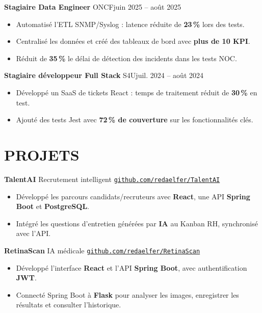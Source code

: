 \documentclass[11pt,a4paper]{article}
\newcommand{\entry}[2]{\noindent #1\hfill #2\par}
\newcommand{\jobgap}{\vspace{5pt}}
\begin{document}
\jobgap
\entry{\textbf{Stagiaire Data Engineer} \textbar{} ONCF}{juin 2025 -- août 2025}
\begin{itemize}
  \item Automatisé l'ETL SNMP/Syslog : latence réduite de \textbf{23\,\%} lors des tests.
  \item Centralisé les données et créé des tableaux de bord avec \textbf{plus de 10 KPI}.
  \item Réduit de \textbf{35\,\%} le délai de détection des incidents dans les tests NOC.
\end{itemize}

\jobgap
\entry{\textbf{Stagiaire développeur Full Stack} \textbar{} S4U}{juil. 2024 -- août 2024}
\begin{itemize}
  \item Développé un SaaS de tickets React : temps de traitement réduit de \textbf{30\,\%} en test.
  \item Ajouté des tests Jest avec \textbf{72\,\% de couverture} sur les fonctionnalités clés.
\end{itemize}

\section*{PROJETS}

\textbf{TalentAI} \textbar{} Recrutement intelligent \textbar{} \href{https://github.com/redaelfer/TalentAI}{\nolinkurl{github.com/redaelfer/TalentAI}}\par
\begin{itemize}
  \item Développé les parcours candidats/recruteurs avec \textbf{React}, une API \textbf{Spring Boot} et \textbf{PostgreSQL}.
  \item Intégré les questions d'entretien générées par \textbf{IA} au Kanban RH, synchronisé avec l'API.
\end{itemize}

\jobgap
\textbf{RetinaScan} \textbar{} IA médicale \textbar{} \href{https://github.com/redaelfer/RetinaScan}{\nolinkurl{github.com/redaelfer/RetinaScan}}\par
\begin{itemize}
  \item Développé l'interface \textbf{React} et l'API \textbf{Spring Boot}, avec authentification \textbf{JWT}.
  \item Connecté Spring Boot à \textbf{Flask} pour analyser les images, enregistrer les résultats et consulter l'historique.
\end{itemize}
\end{document}
